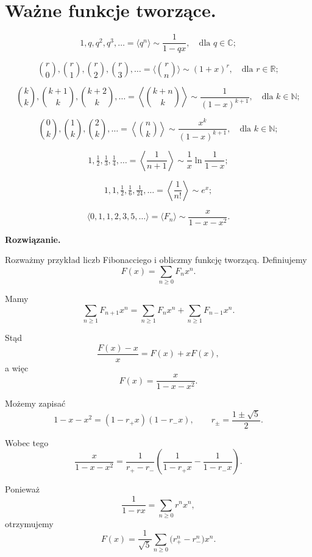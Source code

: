 \documentclass{lecture-kuznia}
\newenvironment{solutionbox}{%
    \begin{mdframed}[style=solstyle]\noindent\textbf{Rozwiązanie.}\par\smallskip
  }{%
    \end{mdframed}
  }
\begin{document}
    \section{\Huge Ważne funkcje tworzące.}

\[
1, q, q^2, q^3, \ldots = \langle q^n \rangle \sim \frac{1}{1 - qx}, \quad \text{dla } q \in \mathbb{C};
\]

\[
\binom{r}{0}, \binom{r}{1}, \binom{r}{2}, \binom{r}{3}, \ldots = \langle \binom{r}{n} \rangle \sim (1+x)^r, \quad \text{dla } r \in \mathbb{R};
\]


\[
\binom{k}{k}, \binom{k+1}{k}, \binom{k+2}{k}, \ldots = \left\langle \binom{k+n}{k} \right\rangle \sim \frac{1}{(1-x)^{k+1}}, \quad \text{dla } k \in \mathbb{N};
\]

\[
\binom{0}{k}, \binom{1}{k}, \binom{2}{k}, \ldots = \left\langle \binom{n}{k} \right\rangle \sim \frac{x^k}{(1-x)^{k+1}}, \quad \text{dla } k \in \mathbb{N};
\]

\[
1, \tfrac{1}{2}, \tfrac{1}{3}, \tfrac{1}{4}, \ldots 
= \left\langle \frac{1}{n+1} \right\rangle \sim \frac{1}{x} \ln \frac{1}{1-x};
\]

\[
1, 1, \tfrac{1}{2}, \tfrac{1}{6}, \tfrac{1}{24}, \ldots 
= \left\langle \frac{1}{n!} \right\rangle \sim e^x;
\]

\[
\langle 0, 1, 1, 2, 3, 5, \ldots \rangle = \langle F_n \rangle \sim \frac{x}{1-x-x^2}.
\]
\begin{solutionbox}
Rozważmy przykład liczb Fibonacciego i obliczmy funkcję tworzącą. Definiujemy
\[
F(x) = \sum_{n \geq 0} F_n x^n.
\]

Mamy
\[
\sum_{n \geq 1} F_{n+1} x^n
= \sum_{n \geq 1} F_n x^n + \sum_{n \geq 1} F_{n-1} x^n.
\]

Stąd
\[
\frac{F(x) - x}{x} = F(x) + xF(x),
\]
a więc
\[
F(x) = \frac{x}{1 - x - x^2}.
\]

Możemy zapisać
\[
1 - x - x^2 = (1 - r_+ x)(1 - r_- x),
\qquad r_\pm = \frac{1 \pm \sqrt{5}}{2}.
\]

Wobec tego
\[
\frac{x}{1 - x - x^2}
= \frac{1}{r_+ - r_-} \left( \frac{1}{1 - r_+ x} - \frac{1}{1 - r_- x} \right).
\]

Ponieważ
\[
\frac{1}{1 - r x} = \sum_{n \geq 0} r^n x^n,
\]
otrzymujemy
\[
F(x) = \frac{1}{\sqrt{5}} \sum_{n \geq 0} \bigl( r_+^n - r_-^n \bigr) x^n.
\]

\end{solutionbox}
\end{document}
